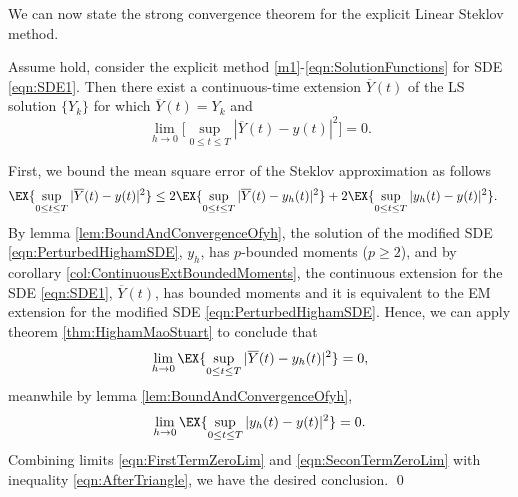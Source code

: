 	We can now state  the strong convergence theorem  for the  explicit Linear Steklov method.%
\begin{thm}
	Assume  hold, consider the 
	explicit \SM method \eqref{m1}-\eqref{eqn:SolutionFunctions} for SDE \eqref{eqn:SDE1}.
	Then there exist a continuous-time extension $\overline{Y}(t)$ of the LS solution
	 $\{Y_k\}$ for which $\overline{Y}(t)=Y_k$ and
	\begin{equation*}
		\lim_{h\rightarrow0}\Big[\sup_{0\leq t\leq T} |\overline{Y}(t) - y(t)|^2\Big]=0.
	\end{equation*}
\end{thm}
\begin{pf}
	First, we bound  the mean square error of the Steklov approximation as follows
	\begin{align}\label{eqn:AfterTriangle}
		\EX{\sup_{0\leq t \leq T}|\overline{Y}(t) - y(t)|^2}
		&\leq
		2\EX{
			\sup_{0\leq t \leq T}
			|\overline{Y}(t) - y_h(t)|^2
		}
		+
		2\EX{
			\sup_{0\leq t \leq T}
			|y_h(t) - y(t)|^2
		}.
	\end{align}
	 By lemma \ref{lem:BoundAndConvergenceOfyh}, the solution of the modified SDE \eqref{eqn:PerturbedHighamSDE}, $y_h$, has
	$p$-bounded moments ($p\geq 2$), and by corollary \ref{col:ContinuousExtBoundedMoments}, 
	the \SM continuous extension for the SDE \eqref{eqn:SDE1}, $\overline{Y}(t)$, 
	has bounded moments and it is equivalent to the EM extension for the modified SDE 
	\eqref{eqn:PerturbedHighamSDE}. Hence, we can apply 
	theorem	\ref{thm:HighamMaoStuart} to conclude that
	\begin{equation}\label{eqn:FirstTermZeroLim}
		\lim_{h\to 0}
		\EX{
			\sup_{0\leq t \leq T}
			|\overline{Y}(t) - y_h(t)|^2
		} = 0,
	\end{equation}
	 meanwhile by lemma \ref{lem:BoundAndConvergenceOfyh},
	\begin{equation}\label{eqn:SeconTermZeroLim}
		\lim_{h\to 0}
		\EX{
			\sup_{0\leq t \leq T}
			|y_h(t) - y(t)|^2
		} = 0.
	\end{equation}
	Combining limits \eqref{eqn:FirstTermZeroLim} and \eqref{eqn:SeconTermZeroLim} with 
	inequality \eqref{eqn:AfterTriangle}, we have the desired conclusion. \qed
\end{pf}
%


